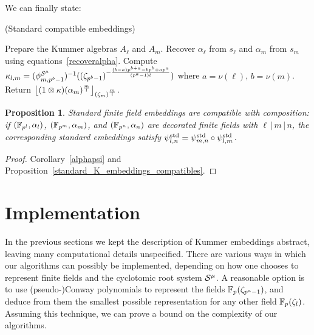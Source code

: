 \documentclass{sig-alternate}
\newtheorem{proposition}[theorem]{Proposition}
\begin{document}
We can finally state:
\begin{algorithm}
  \caption{(Standard compatible embeddings)}
  \label{algo:std_embed}
  \begin{algorithmic}[1]
  \STATE Prepare the Kummer algebras $A_\ell$ and $A_m$.
  \STATE Recover $\alpha_\ell$ from $s_\ell$ and $\alpha_m$ from $s_m$ using equations~\eqref{recoveralpha}.\vspace{-.7\baselineskip}
  \STATE Compute $\kappa_{l,m}=({\phi^{\mathcal{S}^\mu}_{{m},{p^b-1}}})^{-1}((\zeta_{p^b-1})^{-\frac{(b-a)p^{b+a}-bp^b+ap^a}{(p^a-1)l}})$ where $a=\nu(\ell)$, $b=\nu(m)$.
  \STATE Return $\left\lfloor (1\otimes\kappa)(\alpha_m)^{\frac{m}{l}} \right\rfloor_{(\zeta_m)^{\frac{m}{l}}}$.
  \end{algorithmic}
\end{algorithm}
\begin{proposition}
\label{standard_ff_embeddings_compatibles}
Standard finite field embeddings are compatible with composition:
if $(\mathbb{F}_{p^l},\alpha_l)$, $(\mathbb{F}_{p^m},\alpha_m)$, and $(\mathbb{F}_{p^n},\alpha_n)$ are decorated finite fields
with $\ell\,|\,m\,|\,n$, the corresponding standard embeddings
satisfy ${\psi^{\mathrm{std}}_{{l},{n}}}={\psi^{\mathrm{std}}_{{m},{n}}}\circ{\psi^{\mathrm{std}}_{{l},{m}}}$.
\end{proposition}
\begin{proof}
Corollary~\ref{alphapsi} and Proposition~\ref{standard_K_embeddings_compatibles}.
\end{proof}

\section{Implementation}
\label{sec:implementation}

In the previous sections we kept the description of Kummer embeddings
abstract, leaving many computational details unspecified. %
There are various ways in which our algorithms can possibly be
implemented, depending on how one chooses to represent finite fields
and the cyclotomic root system $\mathcal{S}^\mu$. %
A reasonable option is to use (pseudo-)Conway polynomials to represent
the fields $\mathbb{F}_p(\zeta_{p^a-1})$, and deduce from them the smallest
possible representation for any other field $\mathbb{F}_p(\zeta_l)$. %
Assuming this technique, we can prove a bound on the complexity of our
algorithms.
\end{document}
